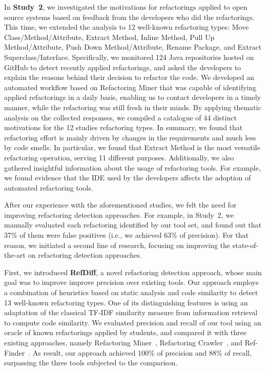 In \textbf{Study~2}, we investigated the motivations for refactorings applied to open source systems based on feedback from the developers who did the refactorings.
This time, we extended the analysis to 12 well-known refactoring types: Move Class/Method/Attribute, Extract Method, Inline Method, Pull Up Method/Attribute, Push Down Method/Attribute, Rename Package, and Extract Superclass/Interface.
Specifically, we monitored 124 Java repositories hosted on GitHub to detect recently applied refactorings, and asked the developers to explain the reasons behind their decision to refactor the code.
We developed an automated workflow based on Refactoring Miner that was capable of identifying applied refactorings in a daily basis, enabling us to contact developers in a timely manner, while the refactoring was still fresh in their minds.
By applying thematic analysis on the collected responses, we compiled a catalogue of 44 distinct motivations for the 12 studies refactoring types.
In summary, we found that refactoring effort is mainly driven by changes in the requirements and much less by code smells.
In particular, we found that Extract Method is the most versatile refactoring operation, serving 11 different purposes.
Additionally, we also gathered insightful information about the usage of refactoring tools. For example, we found evidence that the IDE used by the developers affects the adoption of automated refactoring tools.


After our experience with the aforementioned studies, we felt the need for improving refactoring detection approaches.
For example, in Study~2, we manually evaluated each refactoring identified by our tool set, and found out that 37\% of them were false positives (i.e., we achieved 63\% of precision).
For that reason, we initiated a second line of research, focusing on improving the state-of-the-art on refactoring detection approaches.

First, we introduced \textbf{RefDiff}, a novel refactoring detection approach, whose main goal was to improve improve precision over existing tools.
Our approach employs a combination of heuristics based on static analysis and code
similarity to detect 13 well-known refactoring types.
One of its distinguishing features is using an adaptation of the classical TF-IDF similarity measure from information retrieval to compute code similarity.
We evaluated precision and recall of our tool using an oracle of known refactorings applied by students, and compared it with three existing approaches, namely Refactoring Miner~\citep{tsantalis_empiricalstudy}, Refactoring Crawler~\citep{dig2006automated}, and Ref-Finder~\citep{Kim:2010:RefFinder}.
As result, our approach achieved 100\% of precision and 88\% of recall, surpassing the three tools subjected to the comparison.

